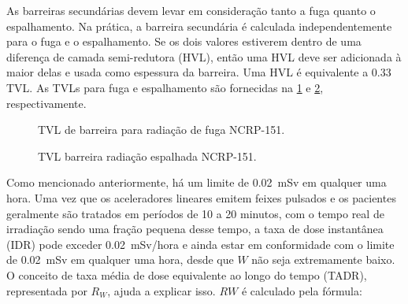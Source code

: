\documentclass[11pt,a4paper]{article}
\begin{document}
	As barreiras secundárias devem levar em consideração tanto a fuga quanto o espalhamento. Na prática, a barreira secundária é calculada independentemente para o fuga e o espalhamento. Se os dois valores estiverem dentro de uma diferença de camada semi-redutora (HVL), então uma HVL deve ser adicionada à maior delas e usada como espessura da barreira. Uma HVL é equivalente a 0.33 TVL. As TVLs para fuga e espalhamento são fornecidas na \ref{fig:prTvlFul} e \ref{fig:prTvlEsp}, respectivamente.

	\begin{figure}[h]
		\centering
		\caption{TVL de barreira para radiação de fuga NCRP-151.}
		\label{fig:prTvlFul}
	\end{figure}

	\begin{figure}[h]
		\centering
		\caption{TVL barreira radiação espalhada NCRP-151.}
		\label{fig:prTvlEsp}
	\end{figure}

	Como mencionado anteriormente, há um limite de \SI{0.02}{\milli\sievert} em qualquer uma hora. Uma vez que os aceleradores lineares emitem feixes pulsados e os pacientes geralmente são tratados em períodos de 10 a 20 minutos, com o tempo real de irradiação sendo uma fração pequena desse tempo, a taxa de dose instantânea (IDR) pode exceder \SI{0.02}{\milli\sievert}/hora e ainda estar em conformidade com o limite de \SI{0.02}{\milli\sievert} em qualquer uma hora, desde que $W$ não seja extremamente baixo. O conceito de taxa média de dose equivalente ao longo do tempo (TADR), representada por $R_W$, ajuda a explicar isso. $RW$ é calculado pela fórmula:
\end{document}
